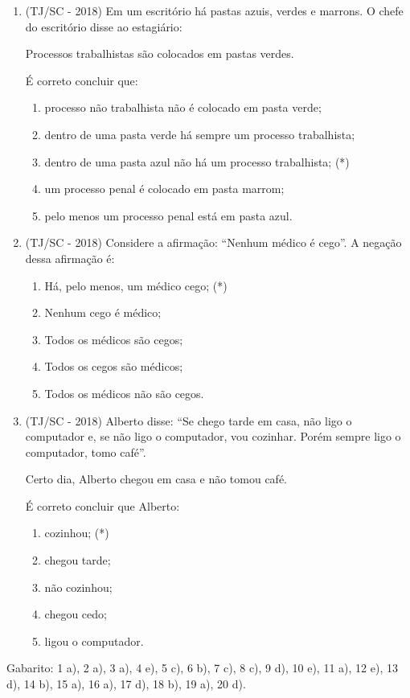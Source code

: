 \begin{enumerate}
  \item (TJ/SC - 2018) Em um escritório há pastas azuis, verdes e marrons. O chefe do escritório disse ao estagiário:

  Processos trabalhistas são colocados em pastas verdes.

  É correto concluir que:
  \begin{enumerate}
  \item processo não trabalhista não é colocado em pasta verde;
  \item dentro de uma pasta verde há sempre um processo trabalhista;
  \item dentro de uma pasta azul não há um processo trabalhista; (*)
  \item um processo penal é colocado em pasta marrom;
  \item pelo menos um processo penal está em pasta azul.
 \end{enumerate}

  \item (TJ/SC - 2018) Considere a afirmação: ``Nenhum médico é cego''. A negação dessa afirmação é:
  \begin{enumerate}
  \item Há, pelo menos, um médico cego; (*)
  \item Nenhum cego é médico;
  \item Todos os médicos são cegos;
  \item Todos os cegos são médicos;
  \item Todos os médicos não são cegos.
 \end{enumerate}

 \item (TJ/SC - 2018) Alberto disse: ``Se chego tarde em casa, não ligo o computador e, se não ligo o computador, vou cozinhar. Porém sempre ligo o computador, tomo café''.

  Certo dia, Alberto chegou em casa e não tomou café.

  É correto concluir que Alberto:
  \begin{enumerate}
  \item cozinhou; (*)
  \item chegou tarde;
  \item não cozinhou;
  \item chegou cedo;
  \item ligou o computador.
 \end{enumerate}

\end{enumerate}

Gabarito: 1 a), 2 a), 3 a), 4 e), 5 c), 6 b), 7 c), 8 c), 9 d), 10 e), 11 a), 12 e), 13 d), 14 b), 15 a), 16 a), 17 d), 18 b), 19 a), 20 d).

